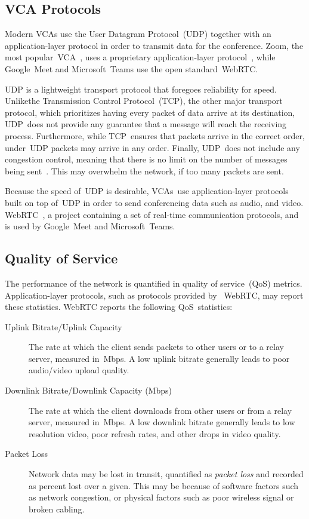     \subsection{VCA Protocols}\label{introduction:qos:udp}
        Modern VCAs use the User Datagram Protocol~(UDP) together with an application-layer protocol in order to transmit data for the conference. Zoom, the most popular~VCA~\autocite{kim2021}, uses a proprietary application-layer protocol~\autocite{marczak2020}, while Google~Meet and Microsoft~Teams use the open standard~WebRTC.

        UDP is a lightweight transport protocol that foregoes reliability for speed. Unlikethe Transmission Control Protocol~(TCP), the other major transport protocol, which prioritizes having every packet of data arrive at its destination, UDP~does not provide any guarantee that a message will reach the receiving process. Furthermore, while TCP~ensures that packets arrive in the correct order, under~UDP packets may arrive in any order. Finally, UDP~does not include any congestion control, meaning that there is no limit on the number of messages being sent~\autocite{alma990025667610203776}. This may overwhelm the network, if too many packets are sent.

        Because the speed of~UDP is desirable, VCAs~use application-layer protocols built on top of~UDP in order to send conferencing data such as audio, and video. WebRTC~, a project containing a set of real-time communication protocols, and is used by Google~Meet and Microsoft~Teams. %

    \subsection{Quality of Service}\label{introduction:qos}
        The performance of the network is quantified in quality of service~(QoS) metrics. Application-layer protocols, such as protocols provided by ~WebRTC, may report these statistics. WebRTC reports the following QoS~statistics:

        \begin{description}
            \item[Uplink Bitrate/Uplink Capacity] The rate at which the client sends packets to other users or to a relay server, measured in~Mbps. A low uplink bitrate generally leads to poor audio/video upload quality.

            \item[Downlink Bitrate/Downlink Capacity (Mbps)] The rate at which the client downloads from other users or from a relay server, measured in~Mbps. A low downlink bitrate generally leads to low resolution video, poor refresh rates, and other drops in video quality.

            \item[Packet Loss] Network data may be lost in transit, quantified as \emph{packet loss} and recorded as percent lost over a given. This may be because of software factors such as network congestion, or physical factors such as poor wireless signal or broken cabling.
        \end{description}

